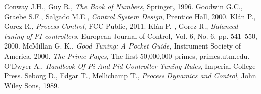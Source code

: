 \documentclass[12pt,a4paper,twoside]{article}
\begin{document}
\vspace{0.2cm}
\begin{thebibliography}{9}

 Conway J.H., Guy R., \emph{The Book of Numbers}, Springer, 1996.
  Goodwin G.C., Graebe S.F., Salgado M.E., \emph{Control System Design}, Prentice Hall, 2000.
 Kl\'{a}n P., Gorez R., \emph{Process Control}, FCC Public, 2011.
 Kl\'{a}n P. , Gorez R., \emph{Balanced tuning of PI controllers}, European Journal of Control, Vol. 6, No. 6, pp. 541--550, 2000. 
 McMillan G. K., \emph{Good Tuning: A Pocket Guide}, Instrument Society of America, 2000.
 \emph{The Prime Pages}, The first 50,000,000 primes, primes.utm.edu.
 O'Dwyer A., \emph{Handbook Of Pi And Pid Controller Tuning Rules}, Imperial College Press.
 Seborg D., Edgar T., Mellichamp T., \emph{Process Dynamics and Control}, John Wiley  Sons, 1989.
\end{thebibliography}
\end{document}
